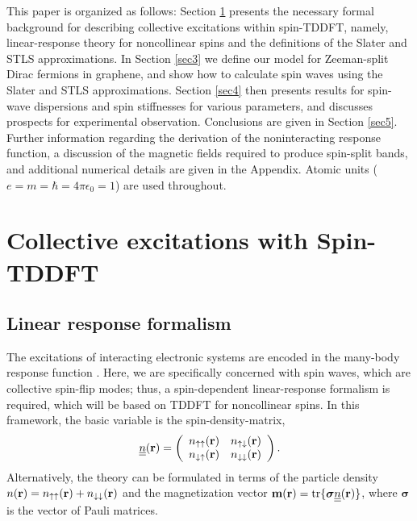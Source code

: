 \documentclass[aps,prb,twocolumn,superscriptaddress]{revtex4-2}
\newcommand{\ud}{{\uparrow\downarrow}}
\newcommand{\du}{{\downarrow\uparrow}}
\newcommand{\uu}{{\uparrow\uparrow}}
\newcommand{\dd}{{\downarrow\downarrow}}
\newcommand{\bfm}{{\bf m}}
\newcommand{\bfr}{{\bf r}}
\begin{document}
This paper is organized as follows: Section \ref{sec2} presents the necessary formal background for describing collective excitations within spin-TDDFT,
namely, linear-response theory for noncollinear spins and the definitions of the Slater and STLS approximations. In
Section \ref{sec3} we define our model for Zeeman-split Dirac fermions in graphene, and show how to calculate spin waves using the Slater and STLS approximations.
Section \ref{sec4} then presents results for spin-wave dispersions and spin stiffnesses for various parameters, and discusses prospects for experimental observation.
Conclusions are given in Section \ref{sec5}.
Further information regarding the derivation of the noninteracting response function, a discussion of the magnetic fields required to produce
spin-split bands, and additional numerical details are given in the Appendix.
Atomic units ($e=m = \hbar = 4\pi \epsilon_0 = 1$) are used throughout.


\section{Collective excitations with Spin-TDDFT}\label{sec2}

\subsection{Linear response formalism}\label{sec2A}

The excitations of interacting electronic systems are encoded in the many-body response function \cite{GiulianiVignale}.
Here, we are specifically concerned with spin waves, which are collective spin-flip modes; thus, a spin-dependent linear-response
formalism is required, which will be based on TDDFT for noncollinear spins. In this framework, the
basic variable is the spin-density-matrix,
\begin{equation}\label{spindensitymatrix}
\underline{\underline n}(\bfr) = \left( \begin{array}{cc} n_{\uu}(\bfr) & n_{\ud}(\bfr) \\ n_{\du}(\bfr) & n_{\dd}(\bfr) \end{array}\right).
\end{equation}
Alternatively, the theory can be formulated in terms of the particle density $n(\bfr) = n_{\uu}(\bfr)+n_{\dd}(\bfr)$ and the
magnetization vector $\bfm(\bfr) = \mbox{tr}\{ {\bm \sigma} \underline{\underline n}(\bfr)\}$, where $\bm\sigma$ is the vector of Pauli matrices.
\end{document}
